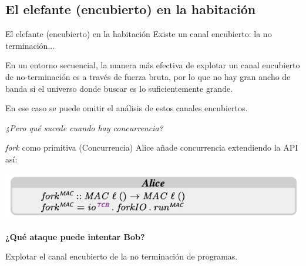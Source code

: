 \documentclass{beamer}
\begin{document}
\subsection{El elefante (encubierto) en la habitación}
\begin{frame}{El elefante (encubierto) en la habitación}
    Existe un canal encubierto: la no terminación...\newline

    En un entorno secuencial, la manera más efectiva de explotar un canal encubierto de no-terminación es a través de fuerza bruta, por lo que no hay gran ancho de banda si el universo donde buscar es lo suficientemente grande. \newline
    
    En ese caso se puede omitir el análisis de estos canales encubiertos.

    \vspace{0.5cm}
    \pause
    \begin{flushright}
        \it{¿Pero qué sucede cuando hay concurrencia?}
    \end{flushright}
    
\end{frame}

\begin{frame}{\textit{fork} como primitiva (Concurrencia)}
    Alice añade concurrencia extendiendo la API así:

    \begin{center}
        \includegraphics[scale=0.8]{codigo_alice2.png}
    \end{center}

    \textbf{¿Qué ataque puede intentar Bob?}\newline

    Explotar el canal encubierto de la no terminación de programas.
\end{frame}
\end{document}
